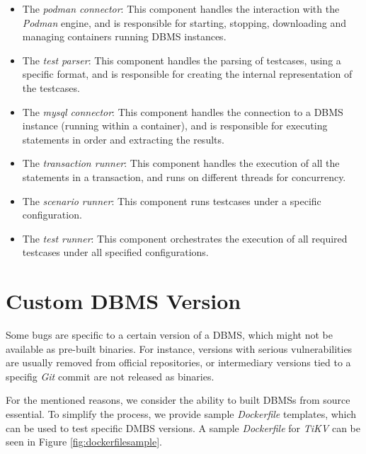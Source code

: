 \begin{itemize}
    \item The \textit{podman connector}: This component handles the interaction with the \textit{Podman} engine, and is responsible for starting, stopping, downloading and managing containers running DBMS instances.
    \item The \textit{test parser}: This component handles the parsing of testcases, using a specific format, and is responsible for creating the internal representation of the testcases.
    \item The \textit{mysql connector}: This component handles the connection to a DBMS instance (running within a container), and is responsible for executing statements in order and extracting the results.
    \item The \textit{transaction runner}: This component handles the execution of all the statements in a transaction, and runs on different threads for concurrency.
    \item The \textit{scenario runner}: This component runs testcases under a specific configuration.
    \item The \textit{test runner}: This component orchestrates the execution of all required testcases under all specified configurations. 
\end{itemize}

\section{Custom DBMS Version}

Some bugs are specific to a certain version of a DBMS, which might not be available as pre-built binaries. For instance, versions with serious vulnerabilities are usually removed from official repositories, or intermediary versions tied to a specifig \textit{Git} commit are not released as binaries.

For the mentioned reasons, we consider the ability to built DBMSs from source essential. To simplify the process, we provide sample \textit{Dockerfile} templates, which can be used to test specific DMBS versions. A sample \textit{Dockerfile} for \textit{TiKV} can be seen in Figure \ref{fig:dockerfilesample}.
 
